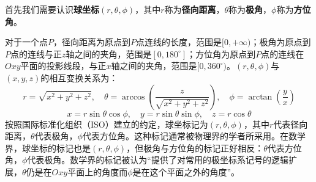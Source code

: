 \documentclass[a4paper]{article}
\begin{document}
首先我们需要认识\textbf{球坐标}$(r,\theta,\phi)$，其中$r$称为\textbf{径向距离}，$\theta$称为\textbf{极角}，$\phi$称为\textbf{方位角}。

对于一个点$P$，径向距离为原点到$P$点连线的长度，范围是$[0,+\infty)$；极角为原点到$P$点的连线与正$z$轴之间的夹角，范围是$[0,180^\circ]$；方位角为原点到$P$点的连线在$Oxy$平面的投影线段，与正$x$轴之间的夹角，范围是$[0,360^\circ)$。$(r,\theta,\phi)$与$(x,y,z)$的相互变换关系为：
\[
    r = \sqrt{x^2 + y^2 + z^2},\quad
    \theta = \arccos(\frac{z}{\sqrt{x^2 + y^2 + z^2}}),\quad
    \phi = \arctan(\frac{y}{x})
\]
\[
    x = r\sin\theta\cos\phi,\quad
    y = r\sin\theta\sin\phi,\quad
    z = r\cos\theta
\]
按照国际标准化组织（ISO）建立的约定，球坐标记为$(r,\theta,\phi)$，其中$r$代表径向距离，$\theta$代表极角，$\phi$代表方位角。这种标记通常被物理界的学者所采用。在数学界，球坐标的标记也是$(r,\theta,\phi)$，但极角与方位角的标记正好相反：$\theta$代表方位角，$\phi$代表极角。数学界的标记被认为“提供了对常用的极坐标系记号的逻辑扩展，$\theta$仍是在$Oxy$平面上的角度而$\phi$是在这个平面之外的角度”。

\end{document}
